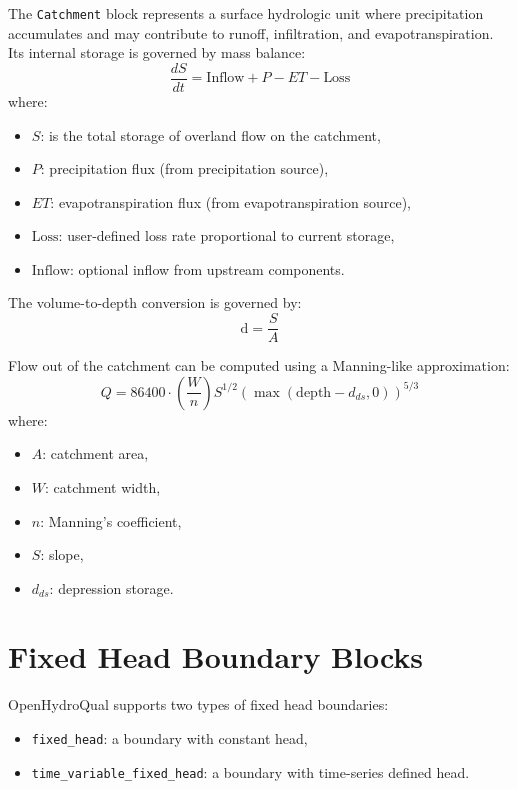 \documentclass[12pt]{report}
\begin{document}
The \texttt{Catchment} block represents a surface hydrologic unit where precipitation accumulates and may contribute to runoff, infiltration, and evapotranspiration. Its internal storage is governed by mass balance:
\begin{equation}
\frac{d S}{d t} = \text{Inflow} + P - ET - \text{Loss}
\end{equation}
where:
\begin{itemize}
  \item $S$: is the total storage of overland flow on the catchment, 
  \item $P$: precipitation flux (from precipitation source),
  \item $ET$: evapotranspiration flux (from evapotranspiration source),
  \item $\text{Loss}$: user-defined loss rate proportional to current storage,
  \item $\text{Inflow}$: optional inflow from upstream components.
\end{itemize}

The volume-to-depth conversion is governed by:
\begin{equation}
\text{d} = \frac{S}{A}
\end{equation}

Flow out of the catchment can be computed using a Manning-like approximation:
\begin{equation}
Q = 86400 \cdot \left(\frac{W}{n}\right) S^{1/2} (\max(\text{depth} - d_{ds}, 0))^{5/3}
\end{equation}
where:
\begin{itemize}
  \item $A$: catchment area, 
  \item $W$: catchment width,
  \item $n$: Manning’s coefficient,
  \item $S$: slope,
  \item $d_{ds}$: depression storage.
\end{itemize}

\section{Fixed Head Boundary Blocks}

OpenHydroQual supports two types of fixed head boundaries:
\begin{itemize}
  \item \texttt{fixed\_head}: a boundary with constant head,
  \item \texttt{time\_variable\_fixed\_head}: a boundary with time-series defined head.
\end{itemize}
\end{document}
